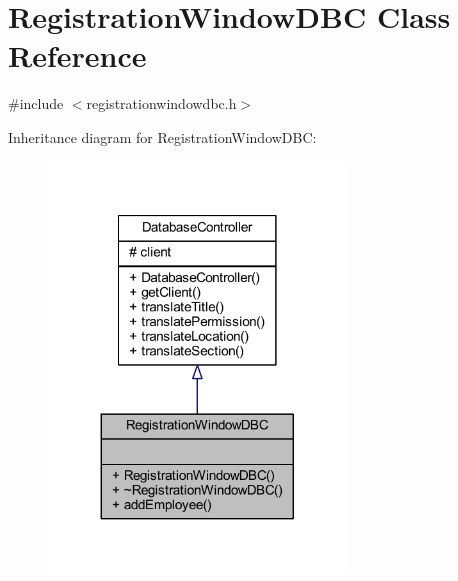 \hypertarget{class_registration_window_d_b_c}{}\section{Registration\+Window\+D\+B\+C Class Reference}
\label{class_registration_window_d_b_c}


{\ttfamily \#include $<$registrationwindowdbc.\+h$>$}



Inheritance diagram for Registration\+Window\+D\+B\+C\+:
\nopagebreak
\begin{figure}[H]
\begin{center}
\leavevmode
\includegraphics[width=224pt]{class_registration_window_d_b_c__inherit__graph}
\end{center}
\end{figure}


